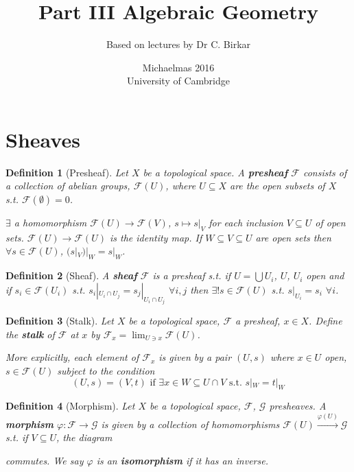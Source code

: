 \documentclass[a4paper]{article}
\title{Part III Algebraic Geometry}
\author{Based on lectures by Dr C. Birkar}
\date{Michaelmas 2016\\University of Cambridge}
\newtheorem*{definition}{Definition}
\begin{document}
\maketitle
\tableofcontents

\section{Sheaves}

\begin{definition}[Presheaf]
	Let $X$ be a topological space. A \textbf{presheaf} $\mathcal{F}$ consists of a collection of abelian groups, $\mathcal{F}(U)$, where $U \subseteq X$ are the open subsets of $X$ s.t. $\mathcal{F}(\emptyset)=0$.
	
	$\exists$ a homomorphism $\mathcal{F}(U)\to\mathcal{F}(V)$, $s \mapsto s|_V$ for each inclusion $V\subseteq U$ of open sets. $\mathcal{F}(U)\to\mathcal{F}(U)$ is the identity map. If $W\subseteq V \subseteq U$ are open sets then $\forall s \in \mathcal{F}(U)$, $(s|_V)|_W=s|_W$.
\end{definition}

\begin{definition}[Sheaf]
	A \textbf{sheaf} $\mathcal{F}$ is a presheaf s.t. if $U=\bigcup U_i$, $U$, $U_i$ open and if $s_i \in \mathcal{F}(U_i)$ s.t. $s_i|_{U_i\cap U_j}=s_j|_{U_i \cap U_j}$ $\forall i,j$ then $\exists ! s\in\mathcal{F}(U)$ s.t. $s|_{U_i}=s_i$ $\forall i$.
\end{definition}

\begin{definition}[Stalk]
	Let $X$ be a topological space, $\mathcal{F}$ a presheaf, $x \in X$. Define the \textbf{stalk} of $\mathcal{F}$ at $x$ by $\mathcal{F}_x = \lim_{U \ni x}\mathcal{F}(U)$.
	
	More explicitly, each element of $\mathcal{F}_x$ is given by a pair $(U, s)$ where $x \in U$ open, $s \in \mathcal{F}(U)$ subject to the condition $$(U,s)=(V,t) \text{ if } \exists x \in W \subseteq U \cap V \text{ s.t. } s|_W=t|_W$$
\end{definition}

\begin{definition}[Morphism]
	Let $X$ be a topological space, $\mathcal{F}$, $\mathcal{G}$ presheaves. A \textbf{morphism} $\varphi: \mathcal{F} \to \mathcal{G}$ is given by a collection of homomorphisms $\mathcal{F}(U)\overset{\varphi(U)}{\to}\mathcal{G}$ s.t. if $V \subseteq U$, the diagram
	\begin{center}

	\end{center}
	
	\noindent commutes. We say $\varphi$ is an \textbf{isomorphism} if it has an inverse.
\end{definition}
\end{document}
